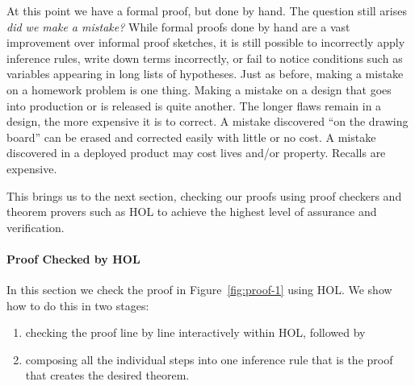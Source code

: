 
At this point we have a formal proof, but done by hand. The question
still arises \emph{did we make a mistake?} While formal proofs done by
hand are a vast improvement over informal proof sketches, it is still
possible to incorrectly apply inference rules, write down terms
incorrectly, or fail to notice conditions such as variables appearing
in long lists of hypotheses. Just as before, making a mistake on a
homework problem is one thing. Making a mistake on a design that goes
into production or is released is quite another. The longer flaws
remain in a design, the more expensive it is to correct.  A mistake
discovered ``on the drawing board'' can be erased and corrected easily
with little or no cost.  A mistake discovered in a deployed product
may cost lives and/or property.  Recalls are expensive.

This brings us to the next section, checking our proofs using proof
checkers and theorem provers such as HOL to achieve the highest level
of assurance and verification.

\paragraph*{Proof Checked by HOL}

In this section we check the proof in Figure~\ref{fig:proof-1} using
HOL. We show how to do this in two stages:
\begin{enumerate}
\item checking the proof line by line interactively within HOL, followed by
\item composing all the individual steps into one inference rule that
  is the proof that creates the desired theorem.
\end{enumerate}

